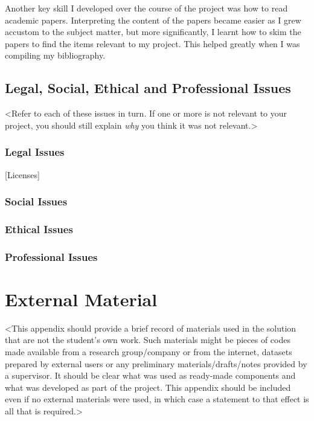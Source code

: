 \begin{appendices}
Another key skill I developed over the course of the project was how to read academic papers. Interpreting the content of the papers became easier as I grew accustom to the subject matter, but more significantly, I learnt how to skim the papers to find the items relevant to my project. This helped greatly when I was compiling my bibliography.

\section{Legal, Social, Ethical and Professional Issues}

<Refer to each of these issues in turn. If one or more is not relevant to your project, you should still explain {\em why} you think it was not relevant.>

\subsection{Legal Issues}

[Licenses]


\subsection{Social Issues}



\subsection{Ethical Issues}

\subsection{Professional Issues}


%
%
\chapter{External Material} \label{ExternalMaterial}
<This appendix should provide a brief record of materials used in the solution that are not the student's own work. Such materials might be pieces of codes made available from a research group/company or from the internet, datasets prepared by external users or any preliminary materials/drafts/notes provided by a supervisor. It should be clear what was used as ready-made components and what was developed as part of the project. This appendix should be included even if no external materials were used, in which case a statement to that effect is all that is required.>


\end{appendices}
